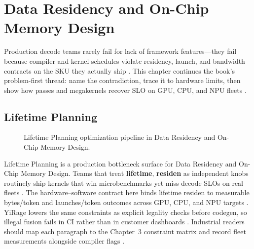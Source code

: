 \chapter{Data Residency and On-Chip Memory Design}
\label{chap:ch06}

Production decode teams rarely fail for lack of framework features---they fail because compiler and kernel schedules violate residency, launch, and bandwidth contracts on the SKU they actually ship \citep{patel2025llminference,nvidia2022hopper}. This chapter continues the book's problem-first thread: name the contradiction, trace it to hardware limits, then show how passes and megakernels recover SLO on GPU, CPU, and NPU fleets \citep{taxbreak2026,semianalysis2024tma}.

\section{Lifetime Planning}
\label{sec:lifetime_planning}
\begin{figure}[t]
\centering
{}
\caption{Lifetime Planning optimization pipeline in Data Residency and On-Chip Memory Design.}
\label{fig:lifetime_planning_pipeline}
\end{figure}


Lifetime Planning is a production bottleneck surface for Data Residency and On-Chip Memory Design. Teams that treat \textbf{lifetime}, \textbf{residen} as independent knobs routinely ship kernels that win microbenchmarks yet miss decode SLOs on real fleets \citep{patel2025llminference,nvidia2022hopper}. The hardware--software contract here binds lifetime residen to measurable bytes/token and launches/token outcomes across GPU, CPU, and NPU targets \citep{taxbreak2026,semianalysis2024tma}. YiRage lowers the same constraints as explicit legality checks before codegen, so illegal fusion fails in CI rather than in customer dashboards \citep{memoryfloor2026,amd2024xdna}. Industrial readers should map each paragraph to the Chapter~3 constraint matrix and record fleet measurements alongside compiler flags \citep{nvidia2022hopper,amd2024aie}.

